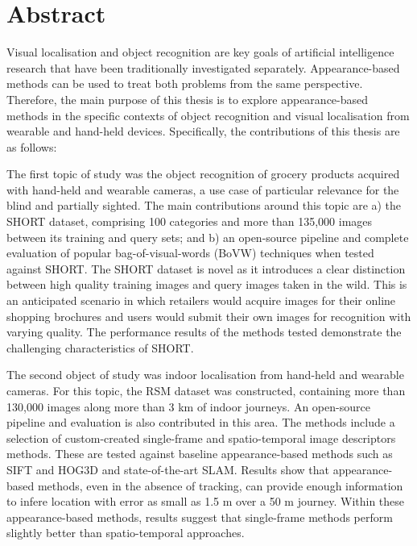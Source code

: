 \begingroup
\let\clearpage\relax
\let\cleardoublepage\relax
\let\cleardoublepage\relax

\chapter*{Abstract}

Visual localisation and object recognition are key goals of artificial intelligence research that have been traditionally investigated separately. Appearance-based methods can be used to treat both problems from the same perspective. Therefore, the main purpose of this thesis is to explore appearance-based methods in the specific contexts of object recognition and visual localisation from wearable and hand-held devices. Specifically, the contributions of this thesis are as follows:

The first topic of study was the object recognition of grocery products acquired with hand-held and wearable cameras, a use case of particular relevance for the blind and partially sighted. The main contributions around this topic are a) the SHORT dataset, comprising 100 categories and more than 135,000 images between its training and query sets; and b) an open-source pipeline and complete evaluation of popular bag-of-visual-words (BoVW) techniques when tested against SHORT. The SHORT dataset is novel as it introduces a clear distinction between high quality training images and query images taken in the wild. This is an anticipated scenario in which retailers would acquire images for their online shopping brochures and users would submit their own images for recognition with varying quality. The performance results of the methods tested demonstrate the challenging characteristics of SHORT.

The second object of study was indoor localisation from hand-held and wearable cameras. For this topic, the RSM dataset was constructed, containing more than 130,000 images along more than 3 km of indoor journeys. An open-source pipeline and evaluation is also contributed in this area. The methods include a selection of custom-created single-frame and spatio-temporal image descriptors methods. These are tested against baseline appearance-based methods such as SIFT and HOG3D and state-of-the-art SLAM. Results show that appearance-based methods, even in the absence of tracking, can provide enough information to infere location with error as small as 1.5 m over a 50 m journey. Within these appearance-based methods, results suggest that single-frame methods perform slightly better than spatio-temporal approaches.

